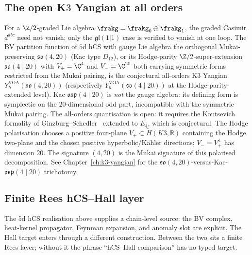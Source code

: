\subsection{The open K$3$ Yangian at all orders}
\label{subsec:phiutp-super-yangian}

\begin{remark}
\label{rem:phiutp-super-yangian-k3}
For a $\Z/2$-graded Lie algebra $\frakg = \frakg_0 \oplus \frakg_1$,
the graded Casimir $d^{abc}$ need not vanish; only the
$\mathfrak{gl}(1|1)$ case is verified to vanish at one loop. The BV
partition function of $5$d hCS with gauge Lie algebra the orthogonal
Mukai-preserving $\mathfrak{so}(4, 20)$ \textup{(}Kac type
$D_{12}$\textup{)}, or its Hodge-parity
$\Z/2$-super-extension $\mathfrak{so}(4 \mid 20)$ with $V_+ = \C^4$
and $V_- = \C^{20}$ both carrying symmetric forms restricted from
the Mukai pairing, is the conjectural all-orders K$3$ Yangian
$Y^{\mathrm{VOA}}_\hbar(\mathfrak{so}(4, 20))$ \textup{(}respectively
$Y^{\mathrm{VOA}}_\hbar(\mathfrak{so}(4 \mid 20))$ at the
Hodge-parity-extended level\textup{)}. Kac $\mathfrak{osp}(4 \mid 20)$
is \emph{not} the gauge algebra: its defining form is symplectic on
the $20$-dimensional odd part, incompatible with the symmetric Mukai
pairing. The all-orders quantisation is open: it requires the
Kontsevich formality of Ginzburg--Schedler~\cite{GinzburgSchedler2008}
extended to $E_4$, which is conjectural. The Hodge polarisation chooses
a positive four-plane \(V_+\subset \widetilde H(K3,\mathbb{R})\)
containing the Hodge two-plane and the chosen positive hyperbolic/K\"ahler
directions; \(V_-=V_+^\perp\) has dimension \(20\). The signature
$(4,20)$ is the Mukai signature of this polarised decomposition.
See Chapter~\ref{ch:k3-yangian} for the
$\mathfrak{so}(4, 20)$-versus-Kac-$\mathfrak{osp}(4 \mid 20)$
trichotomy.
\end{remark}

\subsection{Finite Rees hCS--Hall layer}
\label{subsec:phiutp-chain-level-completion}

The $5$d hCS realisation above supplies a chain-level source: the BV
complex, heat-kernel propagator, Feynman expansion, and anomaly slot
are explicit. The Hall target enters through a different construction.
Between the two sits a finite Rees layer; without it the phrase
``hCS--Hall comparison'' has no typed target.

